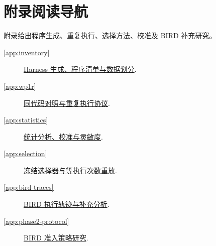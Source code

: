\FloatBarrier
{}
\section*{附录阅读导航}
附录给出程序生成、重复执行、选择方法、校准及 BIRD 补充研究。
\begin{description}
\item[\ref{app:inventory}] \hyperref[app:inventory]{Harness 生成、程序清单与数据划分}.
\item[\ref{app:wp1r}] \hyperref[app:wp1r]{同代码对照与重复执行协议}.
\item[\ref{app:statistics}] \hyperref[app:statistics]{统计分析、校准与灵敏度}.
\item[\ref{app:selection}] \hyperref[app:selection]{冻结选择器与等执行次数重放}.
\item[\ref{app:bird-traces}] \hyperref[app:bird-traces]{BIRD 执行轨迹与补充分析}.
\item[\ref{app:phase2-protocol}] \hyperref[app:phase2-protocol]{BIRD 准入策略研究}.
\end{description}
\FloatBarrier

\FloatBarrier

\FloatBarrier

\FloatBarrier

\FloatBarrier

\FloatBarrier

\FloatBarrier
